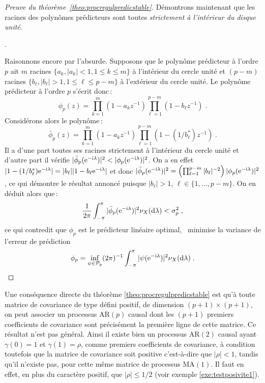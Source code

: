 \begin{proof}[Preuve du th\'eor\`eme~\ref{theo:procregulpredicstable}]
D\'emontrons maintenant que les racines des polyn\^omes
pr\'edicteurs sont toutes \emph{strictement à l'intérieur du disque unité}.

.


Raisonnons encore par l'absurde. Supposons que le
polyn\^ome pr\'edicteur \`a l'ordre $p$ ait $m$ racines $\{a_k,
|a_k| < 1, 1 \le k \leq m \}$ \`a l'int\'erieur du cercle unit\'e et
$(p-m)$ racines $\{ b_{\ell}, |b_{\ell}| > 1, 1 \leq \ell \leq p-m
\}$ \`a l'ext\'erieur du cercle unit\'e. Le polyn\^ome pr\'edicteur
\`a l'ordre $p$ s'\'ecrit donc\,:
\[
 \phi_p(z)=
 \prod_{k=1}^m ( 1 - a_k z^{-1}) \prod_{\ell=1}^{p-m} (1 - b_{\ell} z^{-1})\;.
\]
Consid\'erons alors le polyn\^ome\,:
\[
 \bar{\phi}_p(z) =
 \prod_{k=1}^m (1 - a_k z^{-1}) \prod_{\ell=1}^{p-m} (1 - (1/b_{\ell}^{*}) z^{-1})\;.
\]
Il a d'une part toutes ses racines strictement \`a l'int\'erieur
du cercle unit\'e et d'autre part il v\'erifie
$|\bar{\phi}_p(\mathrm{e}^{-\mathrm{i}\lambda })|^2< |\phi_p(\mathrm{e}^{-\mathrm{i}\lambda })|^2$. On a
en effet $| 1 - (1/b_\ell^*) \mathrm{e}^{-\mathrm{i}\lambda } | = |b_\ell| |1 - b_\ell \mathrm{e}^{-\mathrm{i} \lambda }|$ et donc
$|\bar{\phi}_p(\mathrm{e}^{-\mathrm{i} \lambda })|^2 = \left (\prod_{\ell=1}^{p-m} |b_\ell|^{-2} \right )|\phi_p(\mathrm{e}^{-\mathrm{i}\lambda })|^2$, ce qui d\'emontre le r\'esultat
annonc\'e puisque $|b_\ell| >1$, $\ell \in \{1, \dots, p-m\}$. On en d\'eduit alors
que\,:
\begin{gather*}
\frac{1}{2 \pi} \int_{-\pi}^{\pi} | \bar{\phi}_p(\mathrm{e}^{-\mathrm{i}\lambda
})|^2 \nu_X(\mathrm{d}\lambda )   < \sigma_p^2\;,
\end{gather*}
ce qui contredit que $\phi_p$ est le prédicteur linéaire optimal, \ie\ minimise la variance de l'erreur de prédiction
\[
\phi_p=\inf_{\psi \in \mathcal{P}_p}(2\pi)^{-1}
\int_{-\pi}^\pi |\psi(\mathrm{e}^{-\mathrm{i}\lambda })|^2 \nu_X(\mathrm{d}\lambda ) \;.
\]

\end{proof}
Une cons\'equence directe du th\'eor\`eme
\ref{theo:procregulpredicstable} est qu'\`a toute matrice de
covariance de type d\'efini positif, de dimension $(p+1)\times
(p+1)$, on peut associer un processus AR$(p)$ causal dont les
$(p+1)$ premiers coefficients de covariance sont pr\'ecis\'ement la
premi\`ere ligne de cette matrice. Ce r\'esultat n'est pas g\'en\'eral.
Ainsi il existe bien un processus AR$(2)$ causal ayant
$\gamma(0)=1$ et $\gamma(1)=\rho$, comme premiers coefficients de
covariance, \`a condition toutefois que la matrice de covariance
soit positive c'est-\`a-dire que $|\rho|<1$, tandis qu'il n'existe
pas, pour cette m\^{e}me matrice de processus MA$(1)$. Il faut en
effet, en plus du caract\`ere positif, que $|\rho|\leq 1/2$
(voir exemple \ref{exe:testposivite1}).

